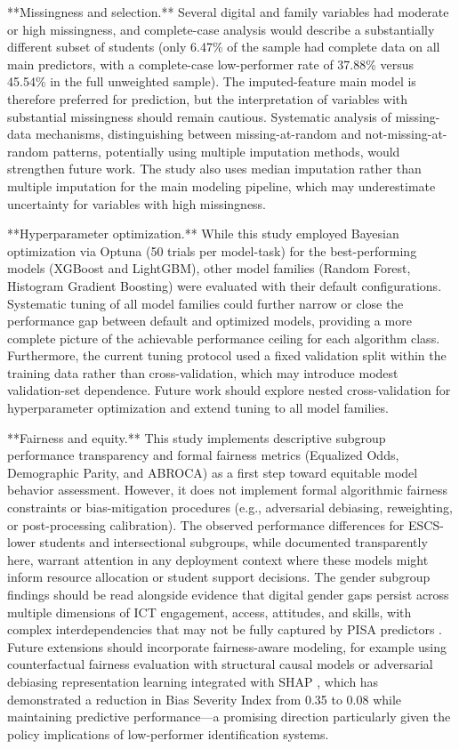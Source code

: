 \documentclass[pdflatex,sn-mathphys-ay]{sn-jnl}
\begin{document}
**Missingness and selection.** Several digital and family variables had moderate or high missingness, and complete-case analysis would describe a substantially different subset of students (only 6.47\% of the sample had complete data on all main predictors, with a complete-case low-performer rate of 37.88\% versus 45.54\% in the full unweighted sample). The imputed-feature main model is therefore preferred for prediction, but the interpretation of variables with substantial missingness should remain cautious. Systematic analysis of missing-data mechanisms, distinguishing between missing-at-random and not-missing-at-random patterns, potentially using multiple imputation methods, would strengthen future work. The study also uses median imputation rather than multiple imputation for the main modeling pipeline, which may underestimate uncertainty for variables with high missingness.

**Hyperparameter optimization.** While this study employed Bayesian optimization via Optuna (50 trials per model-task) for the best-performing models (XGBoost and LightGBM), other model families (Random Forest, Histogram Gradient Boosting) were evaluated with their default configurations. Systematic tuning of all model families could further narrow or close the performance gap between default and optimized models, providing a more complete picture of the achievable performance ceiling for each algorithm class. Furthermore, the current tuning protocol used a fixed validation split within the training data rather than cross-validation, which may introduce modest validation-set dependence. Future work should explore nested cross-validation for hyperparameter optimization and extend tuning to all model families.

**Fairness and equity.** This study implements descriptive subgroup performance transparency and formal fairness metrics (Equalized Odds, Demographic Parity, and ABROCA) as a first step toward equitable model behavior assessment. However, it does not implement formal algorithmic fairness constraints or bias-mitigation procedures (e.g., adversarial debiasing, reweighting, or post-processing calibration). The observed performance differences for ESCS-lower students and intersectional subgroups, while documented transparently here, warrant attention in any deployment context where these models might inform resource allocation or student support decisions. The gender subgroup findings should be read alongside evidence that digital gender gaps persist across multiple dimensions of ICT engagement, access, attitudes, and skills, with complex interdependencies that may not be fully captured by PISA predictors \citep{Campos_Scherer_2024}. Future extensions should incorporate fairness-aware modeling, for example using counterfactual fairness evaluation with structural causal models \citep{Kim_Kim_2025_fairness} or adversarial debiasing representation learning integrated with SHAP \citep{Hou_Chen_2026_adversarial_debiasing}, which has demonstrated a reduction in Bias Severity Index from 0.35 to 0.08 while maintaining predictive performance---a promising direction particularly given the policy implications of low-performer identification systems.
\end{document}
